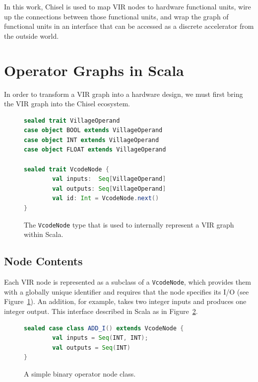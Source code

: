 \documentclass[sigconf, nonacm]{acmart}
\begin{document}
In this work, Chisel is used to map VIR nodes to hardware functional units, wire up the connections between those functional units, and wrap the graph of functional units in an interface that can be accessed as a discrete accelerator from the outside world.


\section{Operator Graphs in Scala}

In order to transform a VIR graph into a hardware design, we must first bring the VIR graph into the Chisel ecosystem.

\begin{figure}
	\begin{center}
		\begin{lstlisting}[language=scala]
sealed trait VillageOperand
case object BOOL extends VillageOperand
case object INT extends VillageOperand
case object FLOAT extends VillageOperand

sealed trait VcodeNode {
		val inputs:  Seq[VillageOperand]
		val outputs: Seq[VillageOperand]
		val id: Int = VcodeNode.next()
}
		\end{lstlisting}
	\end{center}
	\caption{The \texttt{VcodeNode} type that is used to internally represent a VIR graph within Scala.}
	\label{fig:village-graph-node-def}
\end{figure}

\subsection{Node Contents}

Each VIR node is represented as a subclass of a \texttt{VcodeNode}, which provides them with a globally unique identifier and requires that the node specifies its I/O (see Figure~\ref{fig:village-graph-node-def}).
An addition, for example, takes two integer inputs and produces one integer output.
This interface described in Scala as in Figure~\ref{fig:village-graph-addi-def}.

\begin{figure}
	\begin{center}
		\begin{lstlisting}[language=scala]
sealed case class ADD_I() extends VcodeNode {
		val inputs = Seq(INT, INT); 
		val outputs = Seq(INT) 
}
		\end{lstlisting}
	\end{center}
	\caption{A simple binary operator node class.}
	\label{fig:village-graph-addi-def}
\end{figure}
\end{document}
